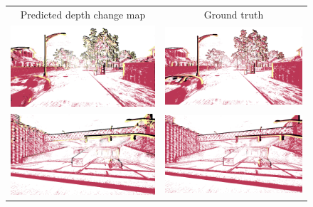 \begin{figure}
  \centering
  \setlength\tabcolsep{1pt}
  \begin{tabular}{@{}cc@{}}
    Predicted depth change map & Ground truth \\
    \includegraphics[width=0.49\linewidth]{mainmatter/figures/4_depth_conv/sled_diff_cmp/pdiff001662.png} &
    \includegraphics[width=0.49\linewidth]{mainmatter/figures/4_depth_conv/sled_diff_cmp/gtdiff001662.png} \\
    \includegraphics[width=0.49\linewidth]{mainmatter/figures/4_depth_conv/sled_diff_cmp/pdiff007812.png} &
    \includegraphics[width=0.49\linewidth]{mainmatter/figures/4_depth_conv/sled_diff_cmp/gtdiff007812.png}
  \end{tabular}
\end{figure}

